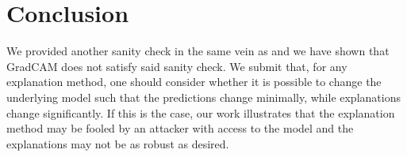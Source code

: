 \documentclass{article}
\begin{document}
\section{Conclusion}

We provided another sanity check in the same vein as \citet{sanity} and we have shown that GradCAM does not satisfy said sanity check. We submit that, for any explanation method, one should consider whether it is possible to change the underlying model such that the predictions change minimally, while explanations change significantly. If this is the case, our work illustrates that the explanation method may be fooled by an attacker with access to the model and the explanations may not be as robust as desired.

\appendix



\end{document}
